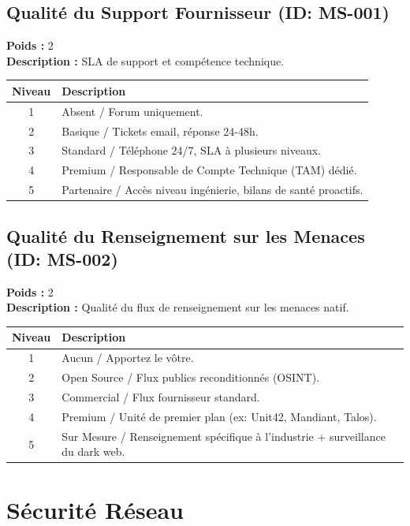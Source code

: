 \documentclass{article}
\begin{document}
\subsection{Qualité du Support Fournisseur (ID: MS-001)}
\textbf{Poids :} 2 \\
\textbf{Description :} SLA de support et compétence technique.
\vspace{0.3cm}
\begin{longtable}{|c|p{12cm}|}
\hline
\rowcolor{lightgray} \textbf{Niveau} & \textbf{Description} \\ \hline
1 & Absent / Forum uniquement. \\ \hline
2 & Basique / Tickets email, réponse 24-48h. \\ \hline
3 & Standard / Téléphone 24/7, SLA à plusieurs niveaux. \\ \hline
4 & Premium / Responsable de Compte Technique (TAM) dédié. \\ \hline
5 & Partenaire / Accès niveau ingénierie, bilans de santé proactifs. \\ \hline
\end{longtable}
\vspace{0.5cm}
\subsection{Qualité du Renseignement sur les Menaces (ID: MS-002)}
\textbf{Poids :} 2 \\
\textbf{Description :} Qualité du flux de renseignement sur les menaces natif.
\vspace{0.3cm}
\begin{longtable}{|c|p{12cm}|}
\hline
\rowcolor{lightgray} \textbf{Niveau} & \textbf{Description} \\ \hline
1 & Aucun / Apportez le vôtre. \\ \hline
2 & Open Source / Flux publics reconditionnés (OSINT). \\ \hline
3 & Commercial / Flux fournisseur standard. \\ \hline
4 & Premium / Unité de premier plan (ex: Unit42, Mandiant, Talos). \\ \hline
5 & Sur Mesure / Renseignement spécifique à l'industrie + surveillance du dark web. \\ \hline
\end{longtable}
\vspace{0.5cm}
\section{Sécurité Réseau}
\end{document}
